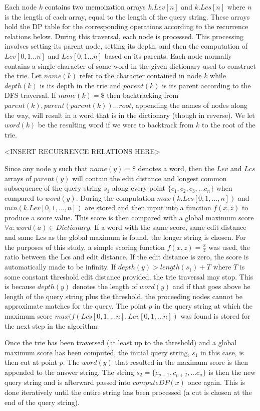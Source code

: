 \documentclass{acm_proc_article-sp}
\begin{document}
Each node $k$ contains two memoization arrays $k.Lev[n]$ and $k.Lcs[n]$ where $n$ is the length of each array, equal to the length of the query string. These arrays hold the DP table for the corresponding operations according to the recurrence relations below. During this traversal, each node is processed. This processing involves setting its parent node, setting its depth, and then the computation of $Lev[0,1. . . n]$ and $Lcs[0,1. . . n]$ based on its parents. Each node normally contains a single character of some word in the given dictionary used to construct the trie. Let $name(k)$ refer to the character contained in node $k$ while $depth(k)$ is its depth in the trie and $parent(k)$ is its parent according to the DFS traversal. If $name(k) = \$$ then backtracking from $parent(k), parent(parent(k)) . . . root$, appending the names of nodes along the way, will result in a word that is in the dictionary (though in reverse). We let $word(k)$ be the resulting word if we were to backtrack from $k$ to the root of the trie. 

<INSERT RECURRENCE RELATIONS HERE> 

Since any node $y$ such that $name(y) = \$$ denotes a word, then the $Lev$ and $Lcs$ arrays of $parent(y)$ will contain the edit distance and longest common subsequence of the query string $s_1$ along every point $\{c_1,c_2,c_3, . . . c_n\}$ when compared to $word(y)$. During the computation $max(k.Lcs[0,1,...,n])$ and $min(k.Lev[0,1,...,n])$ are stored and then input into a function $f(x,z)$ to produce a score value. This score is then compared with a global maximum score $\forall a : word(a) \in Dictionary$. If a word with the same score, same edit distance and same Lcs as the global maximum is found, the longer string is chosen. For the purposes of this study, a simple scoring function $f(x,z) = \frac{x}{z}$ was used, the ratio between the Lcs and edit distance. If the edit distance is zero, the score is automatically made to be infinity. If $depth(y) > length(s_1) + T$ where $T$ is some constant threshold edit distance provided, the trie traversal may stop. This is because $depth(y)$ denotes the length of $word(y)$ and if that goes above he length of the query string plus the threshold, the proceeding nodes cannot be approximate matches for the query. The point $p$ in the query string at which the maximum score $max( f(Lcs[0,1,...n],Lev[0,1,...n])$ was found is stored for the next step in the algorithm. 

Once the trie has been traversed (at least up to the threshold) and a global maximum score has been computed, the initial query string, $s_1$ in this case, is then cut at point $p$. The $word(y)$ that resulted in the maximum score is then appended to the answer string. The string $s_2 = \{c_{p+1}, c_{p+2}, ... c_n\}$ is then the new query string and is afterward passed into $computeDP(x)$ once again. This is done iteratively until the entire string has been processed (a cut is chosen at the end of the query string). 
\end{document}

